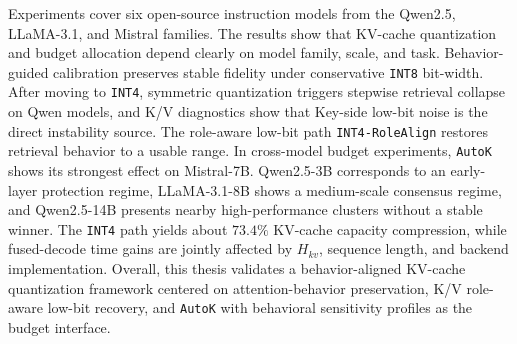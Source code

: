 \begin{abstracten}
Experiments cover six open-source instruction models from the Qwen2.5, LLaMA-3.1, and Mistral families. The results show that KV-cache quantization and budget allocation depend clearly on model family, scale, and task. Behavior-guided calibration preserves stable fidelity under conservative \texttt{INT8} bit-width. After moving to \texttt{INT4}, symmetric quantization triggers stepwise retrieval collapse on Qwen models, and K/V diagnostics show that Key-side low-bit noise is the direct instability source. The role-aware low-bit path \texttt{INT4-RoleAlign} restores retrieval behavior to a usable range. In cross-model budget experiments, \texttt{AutoK} shows its strongest effect on Mistral-7B. Qwen2.5-3B corresponds to an early-layer protection regime, LLaMA-3.1-8B shows a medium-scale consensus regime, and Qwen2.5-14B presents nearby high-performance clusters without a stable winner. The \texttt{INT4} path yields about $73.4\%$ KV-cache capacity compression, while fused-decode time gains are jointly affected by $H_{kv}$, sequence length, and backend implementation. Overall, this thesis validates a behavior-aligned KV-cache quantization framework centered on attention-behavior preservation, K/V role-aware low-bit recovery, and \texttt{AutoK} with behavioral sensitivity profiles as the budget interface.


\end{abstracten}

